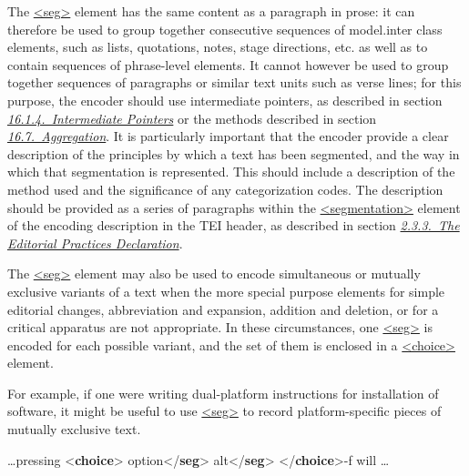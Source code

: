 The \hyperref[TEI.seg]{<seg>} element has the same content as a paragraph in prose: it can therefore be used to group together consecutive sequences of \textsf{model.inter} class elements, such as lists, quotations, notes, stage directions, etc. as well as to contain sequences of phrase-level elements. It cannot however be used to group together sequences of paragraphs or similar text units such as verse lines; for this purpose, the encoder should use intermediate pointers, as described in section \textit{\hyperref[SAPTIP]{16.1.4.\ Intermediate Pointers}} or the methods described in section \textit{\hyperref[SAAG]{16.7.\ Aggregation}}. It is particularly important that the encoder provide a clear description of the principles by which a text has been segmented, and the way in which that segmentation is represented. This should include a description of the method used and the significance of any categorization codes. The description should be provided as a series of paragraphs within the \hyperref[TEI.segmentation]{<segmentation>} element of the encoding description in the TEI header, as described in section \textit{\hyperref[HD53]{2.3.3.\ The Editorial Practices Declaration}}.\par
The \hyperref[TEI.seg]{<seg>} element may also be used to encode simultaneous or mutually exclusive variants of a text when the more special purpose elements for simple editorial changes, abbreviation and expansion, addition and deletion, or for a critical apparatus are not appropriate. In these circumstances, one \hyperref[TEI.seg]{<seg>} is encoded for each possible variant, and the set of them is enclosed in a \hyperref[TEI.choice]{<choice>} element.\par
For example, if one were writing dual-platform instructions for installation of software, it might be useful to use \hyperref[TEI.seg]{<seg>} to record platform-specific pieces of mutually exclusive text. \par\bgroup{}\exampleFont \begin{shaded}\noindent\mbox{}…pressing {<\textbf{choice}>}\mbox{}\newline 
{}option{</\textbf{seg}>}\mbox{}\newline 
{}alt{</\textbf{seg}>}\mbox{}\newline 
{</\textbf{choice}>}-f will …\end{shaded}\egroup\par \par

